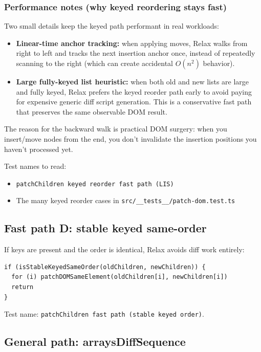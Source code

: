 \subsubsection*{Performance notes (why keyed reordering stays fast)}
Two small details keep the keyed path performant in real workloads:

\begin{itemize}
  \item \textbf{Linear-time anchor tracking:} when applying moves, Relax walks from right to left and tracks the next insertion anchor once, instead of repeatedly scanning to the right (which can create accidental \(O(n^2)\) behavior).
  \item \textbf{Large fully-keyed list heuristic:} when both old and new lists are large and fully keyed, Relax prefers the keyed reorder path early to avoid paying for expensive generic diff script generation. This is a conservative fast path that preserves the same observable DOM result.
\end{itemize}

The reason for the backward walk is practical DOM surgery: when you insert/move nodes from the end, you don't invalidate the insertion positions you haven't processed yet.

Test names to read:

\begin{itemize}
  \item \texttt{patchChildren keyed reorder fast path (LIS)}
  \item The many keyed reorder cases in \texttt{src/\_\_tests\_\_/patch-dom.test.ts}
\end{itemize}

\subsection{Fast path D: stable keyed same-order}

If keys are present and the order is identical, Relax avoids diff work entirely:

\begin{verbatim}
if (isStableKeyedSameOrder(oldChildren, newChildren)) {
  for (i) patchDOMSameElement(oldChildren[i], newChildren[i])
  return
}
\end{verbatim}

Test name: \texttt{patchChildren fast path (stable keyed order)}.

\subsection{General path: arraysDiffSequence}

